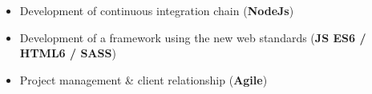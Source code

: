 \documentclass[10pt,a4paper]{altacv}
\begin{document}
\divider

\begin{itemize}
\item Development of continuous integration chain (\textbf{NodeJs}) 
\item Development of a framework using the new web standards (\textbf{JS ES6 / HTML6 / SASS})
\end{itemize}

\divider

\begin{itemize}
\item Project management & client relationship (\textbf{Agile})
\end{itemize}

\medskip



\clearpage
\end{document}

